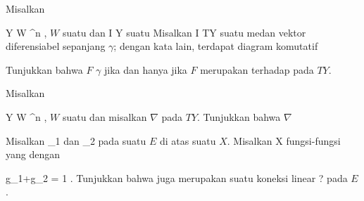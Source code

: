 {}
{

Misalkan

\mavergleichskette
{\vergleichskette
{ Y
}
{ \subseteq }{ W
}
{ \subseteq }{ \R^n
}
{    }{
}
{   }{
}
}
{}{}{,}
$W$
suatu
dan
\maabb {\gamma} { I } { Y
} {}
suatu
Misalkan
 { I } { TY
} {}
suatu medan vektor diferensiabel sepanjang $\gamma$; dengan kata lain, terdapat diagram komutatif

 {  }

Tunjukkan bahwa $F$
$\gamma$ jika dan hanya jika $F$ merupakan
terhadap
 {} {}
pada $TY$.

}
{} {}

{}
{

Misalkan

\mavergleichskette
{\vergleichskette
{ Y
}
{ \subseteq }{ W
}
{ \subseteq }{ \R^n
}
{    }{
}
{   }{
}
}
{}{}{,}
$W$
suatu
dan misalkan $\nabla$
 {} {}
pada $TY$. Tunjukkan bahwa $\nabla$

}
{} {}

{}
{

Misalkan
\mathkor {} {\nabla_1} {dan} {\nabla_2} {}
pada suatu
$E$ di atas suatu
$X$. Misalkan
 { X } { \R
} {}
fungsi-fungsi yang
dengan

\mavergleichskette
{\vergleichskette
{ g_1+g_2
}
{ = }{ 1
}
{  }{
}
{    }{
}
{   }{
}
}
{}{}{.}
Tunjukkan bahwa
 juga merupakan suatu koneksi linear
 {?} {}
pada $E$.

}
{} {}

